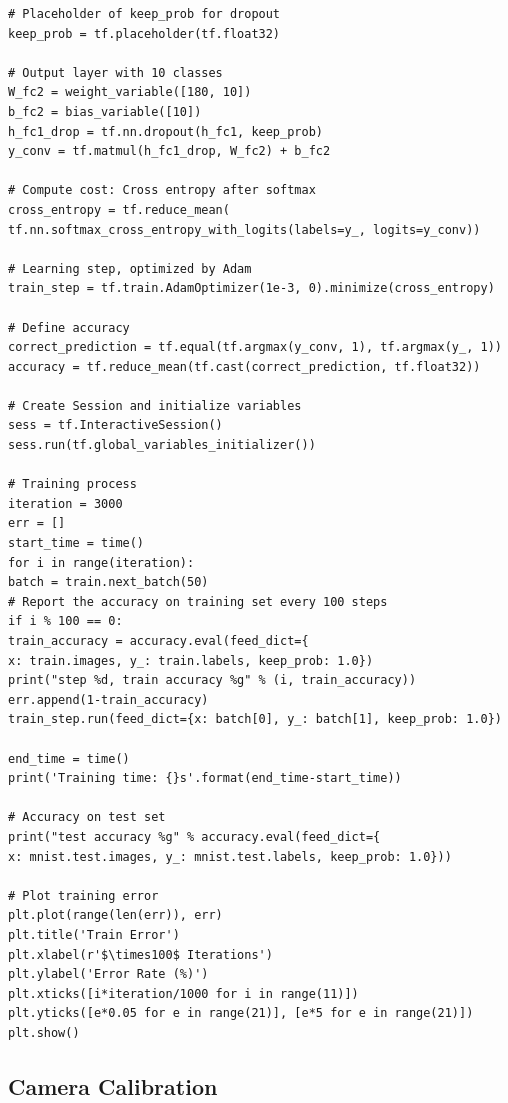 \documentclass{article}
\begin{document}
\begin{lstlisting}
# Placeholder of keep_prob for dropout
keep_prob = tf.placeholder(tf.float32)

# Output layer with 10 classes
W_fc2 = weight_variable([180, 10])
b_fc2 = bias_variable([10])
h_fc1_drop = tf.nn.dropout(h_fc1, keep_prob)
y_conv = tf.matmul(h_fc1_drop, W_fc2) + b_fc2

# Compute cost: Cross entropy after softmax
cross_entropy = tf.reduce_mean(
tf.nn.softmax_cross_entropy_with_logits(labels=y_, logits=y_conv))

# Learning step, optimized by Adam
train_step = tf.train.AdamOptimizer(1e-3, 0).minimize(cross_entropy)

# Define accuracy
correct_prediction = tf.equal(tf.argmax(y_conv, 1), tf.argmax(y_, 1))
accuracy = tf.reduce_mean(tf.cast(correct_prediction, tf.float32))

# Create Session and initialize variables
sess = tf.InteractiveSession()
sess.run(tf.global_variables_initializer())

# Training process
iteration = 3000
err = []
start_time = time()
for i in range(iteration):
batch = train.next_batch(50)
# Report the accuracy on training set every 100 steps
if i % 100 == 0:
train_accuracy = accuracy.eval(feed_dict={
x: train.images, y_: train.labels, keep_prob: 1.0})
print("step %d, train accuracy %g" % (i, train_accuracy))
err.append(1-train_accuracy)
train_step.run(feed_dict={x: batch[0], y_: batch[1], keep_prob: 1.0})

end_time = time()
print('Training time: {}s'.format(end_time-start_time))

# Accuracy on test set
print("test accuracy %g" % accuracy.eval(feed_dict={
x: mnist.test.images, y_: mnist.test.labels, keep_prob: 1.0}))

# Plot training error
plt.plot(range(len(err)), err)
plt.title('Train Error')
plt.xlabel(r'$\times100$ Iterations')
plt.ylabel('Error Rate (%)')
plt.xticks([i*iteration/1000 for i in range(11)])
plt.yticks([e*0.05 for e in range(21)], [e*5 for e in range(21)])
plt.show()

\end{lstlisting}


\subsection{Camera Calibration}
\lstset{language=MATLAB}
\end{document}
